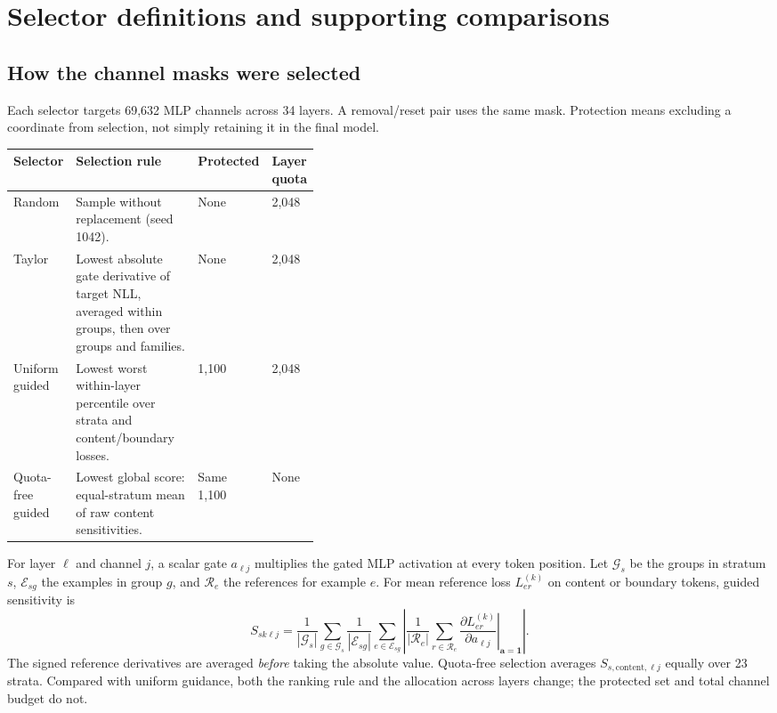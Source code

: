 \documentclass[10pt,letterpaper]{article}
\begin{document}
\label{page:core-end}
\clearpage



\clearpage
\appendix

\section{Selector definitions and supporting comparisons}
\label{app:selectors}
\subsection{How the channel masks were selected}

Each selector targets 69,632 MLP channels across 34 layers. A removal/reset
pair uses the same mask. Protection means excluding a coordinate from
selection, not simply retaining it in the final model.

\begin{center}
\small
\begin{tabular}{@{}lp{0.40\linewidth}ll@{}}
\toprule
Selector & Selection rule & Protected & Layer quota\\
\midrule
Random & Sample without replacement (seed 1042). & None & 2,048\\
Taylor & Lowest absolute gate derivative of target NLL, averaged within groups, then over groups and families. & None & 2,048\\
Uniform guided & Lowest worst within-layer percentile over strata and content/boundary losses. & 1,100 & 2,048\\
Quota-free guided & Lowest global score: equal-stratum mean of raw content sensitivities. & Same 1,100 & None\\
\bottomrule
\end{tabular}
\end{center}

For layer $\ell$ and channel $j$, a scalar gate $a_{\ell j}$ multiplies the
gated MLP activation at every token position. Let $\mathcal G_s$ be the groups
in stratum $s$, $\mathcal E_{sg}$ the examples in group $g$, and $\mathcal R_e$
the references for example $e$. For mean reference loss $L^{(k)}_{er}$ on
content or boundary tokens, guided sensitivity is
\begin{equation}
 S_{sk\ell j}=
 \frac{1}{|\mathcal G_s|}\sum_{g\in\mathcal G_s}
 \frac{1}{|\mathcal E_{sg}|}\sum_{e\in\mathcal E_{sg}}
 \left|\frac{1}{|\mathcal R_e|}\sum_{r\in\mathcal R_e}
 \left.\frac{\partial L^{(k)}_{er}}{\partial a_{\ell j}}\right|_{\boldsymbol a=\boldsymbol 1}\right|.
 \label{eq:guided}
\end{equation}
The signed reference derivatives are averaged \emph{before} taking the
absolute value. Quota-free selection averages $S_{s,\mathrm{content},\ell j}$
equally over 23 strata. Compared with uniform guidance, both the ranking
rule and the allocation across layers change; the protected set and total
channel budget do not.
\end{document}

